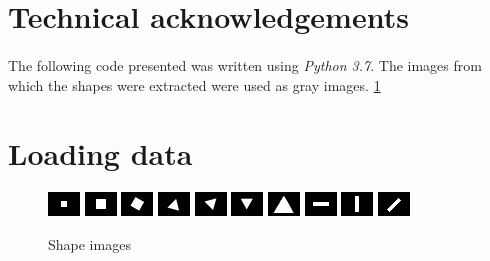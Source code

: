 \section{Technical acknowledgements}
\paragraph{}
The following code presented was written using \emph{Python 3.7}. The images from which the shapes were extracted were used as gray images. \ref{fig:gray-images}

\section{Loading data}
\begin{figure}
    \centering
    \includegraphics[scale=2.0]{rdf-carre-6.png}
    \includegraphics[scale=2.0]{rdf-carre-10.png}
    \includegraphics[scale=2.0]{rdf-carre-10-30deg.png}
    \includegraphics[scale=2.0]{rdf-triangle-10-15deg.png}
    \includegraphics[scale=2.0]{rdf-triangle-10-45deg.png}
    \includegraphics[scale=2.0]{rdf-triangle-10-60deg.png}
    \includegraphics[scale=2.0]{rdf-triangle-20.png}
    \includegraphics[scale=2.0]{rdf-rectangle-horizontal.png}
    \includegraphics[scale=2.0]{rdf-rectangle-vertical.png}
    \includegraphics[scale=2.0]{rdf-rectangle-diagonal.png}
    \caption{Shape images}
    \label{fig:gray-images}
\end{figure}

